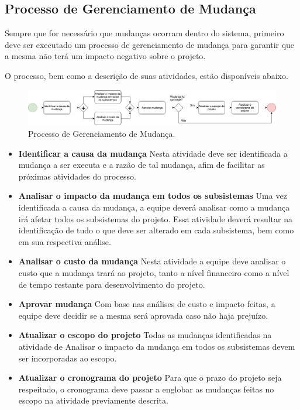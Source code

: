 \subsection{Processo de Gerenciamento de Mudança}
    Sempre que for necessário que mudanças ocorram dentro do sistema, primeiro deve ser executado um processo de gerenciamento de mudança para garantir que a mesma não terá um impacto negativo sobre o projeto.

    O processo, bem como a descrição de suas atividades, estão disponíveis abaixo.

\begin{figure}[!ht]
	\centering
		\includegraphics{figuras/mudanca}
	\caption{Processo de Gerenciamento de Mudança.}
\end{figure}

\begin{itemize}

    O processo de gerenciamento de mudança envole as seguintes atividades:

    \item \textbf{Identificar a causa da mudança}
        Nesta atividade deve ser identificada a mudança a ser executa e a razão de tal mudança, afim de facilitar as próximas atividades do processo.

    \item \textbf{Analisar o impacto da mudança em todos os subsistemas}
        Uma vez identificada a causa da mudança, a equipe deverá analisar como a mudança irá afetar todos os subsistemas do projeto. Essa atividade deverá resultar na identificação de tudo o que deve ser alterado em cada subsistema, bem como em sua respectiva análise.

    \item \textbf{Analisar o custo da mudança}
        Nesta atividade a equipe deve analisar o custo que a mudança trará ao projeto, tanto a nível financeiro como a nível de tempo restante para desenvolvimento do projeto.

    \item\textbf{Aprovar mudança}
        Com base nas análises de custo e impacto feitas, a equipe deve decidir se a mesma será aprovada caso não haja prejuízo.

    \item \textbf{Atualizar o escopo do projeto}
        Todas as mudanças identificadas na atividade de Analisar o impacto da mudança em todos os subsistemas devem ser incorporadas ao escopo.

    \item \textbf{Atualizar o cronograma do projeto}
        Para que o prazo do projeto seja respeitado, o cronograma deve passar a englobar as mudanças feitas no escopo na atividade previamente descrita.

\end{itemize}

